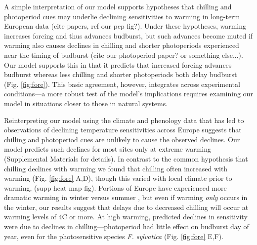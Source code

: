 \documentclass{article}
\begin{document}
\par A simple interpretation of our model supports hypotheses that chilling and photoperiod cues may underlie declining sensitivities to warming in long-term European data (cite papers, ref our pep fig?). Under these hypotheses, warming increases forcing and thus advances budburst, but such advances become muted if warming also causes declines in chilling and shorter photoperiods experienced near the timing of budburst (cite our photoperiod paper? or something else...). Our model supports this in that it predicts that increased forcing advances budburst whereas less chilling and shorter photoperiods both delay budburst (Fig. \ref{fig:fore}). This basic agreement, however, integrates across experimental conditions---a more robust test of the model's implications requires examining our model in situations closer to those in natural systems.

\par Reinterpreting our model using the climate and phenology data that has led to observations of declining temperature sensitivities across Europe suggests that chilling and photoperiod cues are unlikely to cause the observed declines. Our model predicts such declines for most sites only at extreme warming (Supplemental Materials for details). In contrast to the common hypothesis that chilling declines with warming we found that chilling often increased with warming (Fig. \ref{fig:fore} A,D), though this varied with local climate prior to warming, (supp heat map fig). Portions of Europe have experienced more dramatic warming in winter versus summer \cite{balling1998}, but even if warming \emph{only} occurs in the winter, our results suggest that delays due to decreased chilling will occur at warming levels of 4\degree C or more. At high warming, predicted declines in sensitivity were due to declines in chilling---photoperiod had little effect on budburst day of year, even for the photosensitive species \emph{F. sylvatica} (Fig. \ref{fig:fore} E,F).  %
\end{document}
